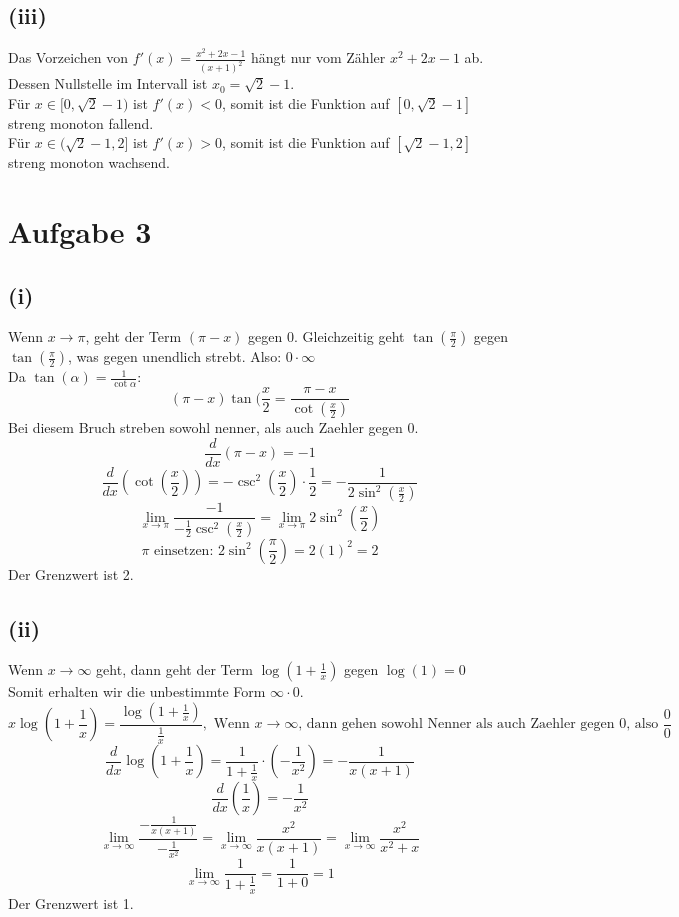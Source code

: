 \documentclass{article}
\begin{document}
\subsection*{(iii)}
Das Vorzeichen von \(f'(x) = \frac{x^2+2x-1}{(x+1)^2}\) hängt nur vom Zähler \(x^2+2x-1\) ab. \\
Dessen Nullstelle im Intervall ist \(x_0 = \sqrt{2}-1\). \\
\newline
Für \(x \in [0, \sqrt{2}-1)\) ist \(f'(x) < 0\), somit ist die Funktion auf \([0, \sqrt{2}-1]\) streng monoton fallend. \\
Für \(x \in (\sqrt{2}-1, 2]\) ist \(f'(x) > 0\), somit ist die Funktion auf \([\sqrt{2}-1, 2]\) streng monoton wachsend.

\section*{Aufgabe 3}
\subsection*{(i)}
Wenn $x \to \pi$, geht der Term $(\pi - x)$ gegen 0. Gleichzeitig geht $\tan(\frac{\pi}{2})$ gegen $\tan(\frac{\pi}{2})$, was gegen unendlich strebt. Also: $0 \cdot \infty$ \\
Da $\tan(\alpha) = \frac{1}{\cot{\alpha}}$:
\[(\pi - x)\tan(\frac{x}{2} = \frac{\pi - x}{\cot(\frac{x}{2})}\]
Bei diesem Bruch streben sowohl nenner, als auch Zaehler gegen 0.
\[\frac{d}{dx}(\pi - x) = -1\]
\[\frac{d}{dx}(\cot(\frac{x}{2})) = -\csc^2(\frac{x}{2}) \cdot \frac{1}{2} = -\frac{1}{2 \sin^2(\frac{x}{2})}\]
\[\lim_{x\to\pi} \frac{-1}{-\frac{1}{2} \csc^2(\frac{x}{2})} = \lim_{x\to\pi} 2 \sin^2(\frac{x}{2})\]
\[\pi\text{ einsetzen: } 2\sin^2(\frac{\pi}{2}) = 2(1)^2 = 2\]
Der Grenzwert ist 2.
\subsection*{(ii)}
Wenn $x \to \infty$ geht, dann geht der Term $\log(1 + \frac{1}{x})$ gegen $\log(1)=0$ \\
Somit erhalten wir die unbestimmte Form $\infty \cdot 0$.
\[x \log \left( 1 + \frac{1}{x} \right) = \frac{\log(1 + \frac{1}{x})}{\frac{1}{x}}, \text{ Wenn } x \to \infty \text{, dann gehen sowohl Nenner als auch Zaehler gegen 0, also } \frac{0}{0}\]
\[\frac{d}{dx}\log(1 + \frac{1}{x}) = \frac{1}{1 + \frac{1}{x}} \cdot (-\frac{1}{x^2}) = -\frac{1}{x(x+1)}\]
\[\frac{d}{dx}(\frac{1}{x}) = - \frac{1}{x^2}\]
\[\lim_{x \to \infty} \frac{- \frac{1}{x(x+1)} }{ -\frac{1}{x^2} } = \lim_{x\to\infty} \frac{x^2}{x(x+1)} = \lim_{x \to \infty} \frac{x^2}{x^2 + x}\]
\[\lim_{x\to\infty} \frac{1}{1 + \frac{1}{x}} = \frac{1}{1+0} = 1\]
Der Grenzwert ist 1.
\end{document}
